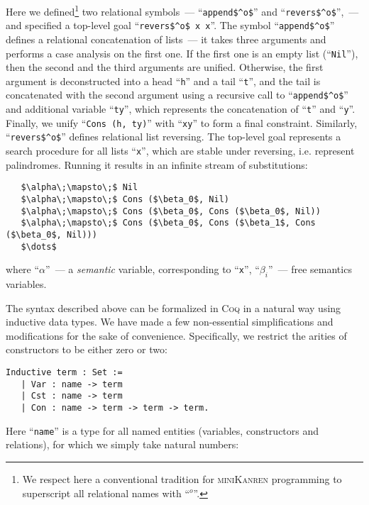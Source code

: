 Here we defined\footnote{We respect here a conventional tradition for \textsc{miniKanren} programming to superscript all relational names with ``$^o$''.}
two relational symbols~--- ``\lstinline|append$^o$|'' and ``\lstinline|revers$^o$|'',~--- and specified a top-level goal ``\lstinline|revers$^o$ x x|''.
The symbol ``\lstinline|append$^o$|'' defines a relational concatenation of lists~--- it takes three arguments and performs a case analysis on the first one. If the
first one is an empty list (``\lstinline|Nil|''), then the second and the third arguments are unified. Otherwise, the first argument is deconstructed into a head ``\lstinline|h|''
and a tail ``\lstinline|t|'', and the tail is concatenated with the second argument using a recursive call to ``\lstinline|append$^o$|'' and additional variable ``\lstinline|ty|'', which
represents the concatenation of ``\lstinline|t|'' and ``\lstinline|y|''. Finally, we unify ``\lstinline|Cons (h, ty)|'' with ``\lstinline|xy|'' to form a final constraint. Similarly,
``\lstinline|revers$^o$|'' defines relational list reversing. The top-level goal represents a search procedure for all lists ``\lstinline|x|'', which are stable under reversing, i.e.
represent palindromes. Running it results in an infinite stream of substitutions:

\begin{lstlisting}
   $\alpha\;\mapsto\;$ Nil
   $\alpha\;\mapsto\;$ Cons ($\beta_0$, Nil)
   $\alpha\;\mapsto\;$ Cons ($\beta_0$, Cons ($\beta_0$, Nil))
   $\alpha\;\mapsto\;$ Cons ($\beta_0$, Cons ($\beta_1$, Cons ($\beta_0$, Nil)))
   $\dots$
\end{lstlisting}

where ``$\alpha$''~--- a \emph{semantic} variable, corresponding to ``\lstinline|x|'', ``$\beta_i$''~--- free semantics variables.

The syntax described above can be formalized in \textsc{Coq} in a natural way using inductive data types. We have made a few non-essential simplifications and modifications for the sake of convenience.
Specifically, we restrict the arities of constructors to be either zero or two:

\begin{lstlisting}[language=Coq] 
   Inductive term : Set :=
   | Var : name -> term
   | Cst : name -> term
   | Con : name -> term -> term -> term.
\end{lstlisting}

Here ``\lstinline[language=Coq]{name}'' is a type for all named entities (variables, constructors and relations), for which we simply take natural numbers:


